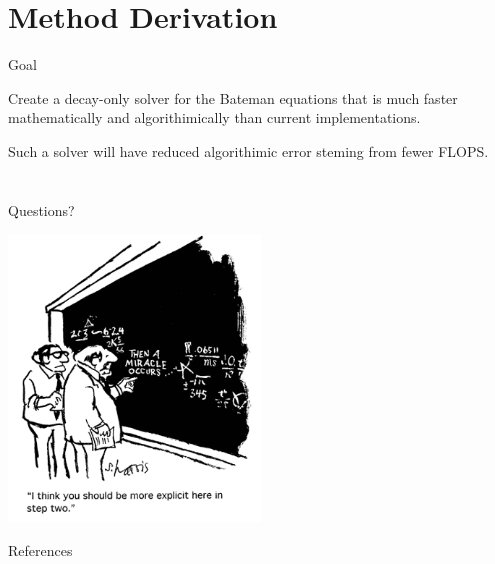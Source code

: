 \documentclass[xcolor=x11names,compress]{beamer}
\begin{document}
\section{Method Derivation}
\begin{frame}{Goal}

    \vspace*{3em}
    Create a decay-only solver for the Bateman equations 
    that is much faster mathematically and algorithimically than current 
    implementations. 

    \vspace*{1em}
    Such a solver will have reduced algorithimic error steming from fewer 
    FLOPS.
    
\end{frame}

\section*{}
\begin{frame}[fragile]{Questions?}

    \begin{center}
    \includegraphics[height=3in,clip]{questions-comic.png}
    \end{center}

\end{frame}

\begin{frame}[allowframebreaks]{References}
	
    
\end{frame}
\end{document}
